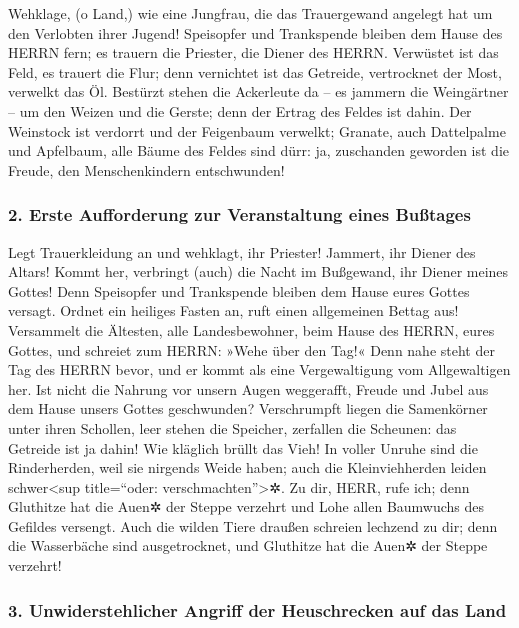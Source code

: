 Wehklage, (o Land,) wie eine Jungfrau, die das
Trauergewand angelegt hat um den Verlobten ihrer Jugend!
Speisopfer und Trankspende bleiben dem Hause des HERRN
fern; es trauern die Priester, die Diener des HERRN.
Verwüstet ist das Feld, es trauert die Flur; denn
vernichtet ist das Getreide, vertrocknet der Most, verwelkt das Öl.
Bestürzt stehen die Ackerleute da -- es jammern die
Weingärtner -- um den Weizen und die Gerste; denn der Ertrag des Feldes
ist dahin. Der Weinstock ist verdorrt und der Feigenbaum
verwelkt; Granate, auch Dattelpalme und Apfelbaum, alle Bäume des Feldes
sind dürr: ja, zuschanden geworden ist die Freude, den Menschenkindern
entschwunden!

\hypertarget{erste-aufforderung-zur-veranstaltung-eines-buuxdftages}{%
\subsubsection{2. Erste Aufforderung zur Veranstaltung eines
Bußtages}\label{erste-aufforderung-zur-veranstaltung-eines-buuxdftages}}

Legt Trauerkleidung an und wehklagt, ihr Priester!
Jammert, ihr Diener des Altars! Kommt her, verbringt (auch) die Nacht im
Bußgewand, ihr Diener meines Gottes! Denn Speisopfer und Trankspende
bleiben dem Hause eures Gottes versagt. Ordnet ein
heiliges Fasten an, ruft einen allgemeinen Bettag aus! Versammelt die
Ältesten, alle Landesbewohner, beim Hause des HERRN, eures Gottes, und
schreiet zum HERRN: »Wehe über den Tag!« Denn nahe steht
der Tag des HERRN bevor, und er kommt als eine Vergewaltigung vom
Allgewaltigen her. Ist nicht die Nahrung vor unsern Augen
weggerafft, Freude und Jubel aus dem Hause unsers Gottes geschwunden?
Verschrumpft liegen die Samenkörner unter ihren Schollen,
leer stehen die Speicher, zerfallen die Scheunen: das Getreide ist ja
dahin! Wie kläglich brüllt das Vieh! In voller Unruhe
sind die Rinderherden, weil sie nirgends Weide haben; auch die
Kleinviehherden leiden schwer\textless sup title=``oder:
verschmachten''\textgreater✲. Zu dir, HERR, rufe ich;
denn Gluthitze hat die Auen✲ der Steppe verzehrt und Lohe allen
Baumwuchs des Gefildes versengt. Auch die wilden Tiere
draußen schreien lechzend zu dir; denn die Wasserbäche sind
ausgetrocknet, und Gluthitze hat die Auen✲ der Steppe verzehrt!

\hypertarget{unwiderstehlicher-angriff-der-heuschrecken-auf-das-land}{%
\subsubsection{3. Unwiderstehlicher Angriff der Heuschrecken auf das
Land}\label{unwiderstehlicher-angriff-der-heuschrecken-auf-das-land}}

